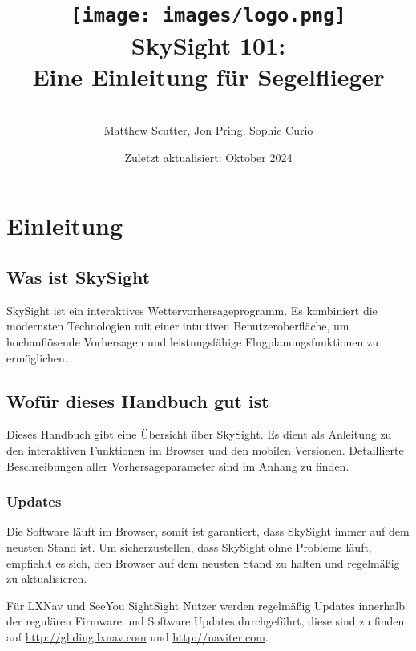 \documentclass[11pt,a4paper]{article}
\title{\texttt{[image: images/logo.png]}\\[1cm]SkySight 101: \\[0.5cm]Eine Einleitung für Segelflieger}
\author{\\Matthew Scutter, Jon Pring, Sophie Curio}
\date{Zuletzt aktualisiert: Oktober 2024}
\begin{document}
\begin{titlepage}
\maketitle
\end{titlepage}

\tableofcontents
\pagebreak

\section{Einleitung}
\subsection{Was ist SkySight}

SkySight ist ein interaktives Wettervorhersageprogramm. Es kombiniert die modernsten Technologien mit einer intuitiven Benutzeroberfläche, um hochauflösende Vorhersagen und leistungsfähige Flugplanungsfunktionen zu ermöglichen.




\subsection{Wofür dieses Handbuch gut ist}

Dieses Handbuch gibt eine Übersicht über SkySight. Es dient als Anleitung zu den interaktiven Funktionen im Browser und den mobilen Versionen. Detaillierte Beschreibungen aller Vorhersageparameter sind im Anhang zu finden.



\subsubsection{Updates}

Die Software läuft im Browser, somit ist garantiert, dass SkySight immer auf dem neusten Stand ist. Um sicherzustellen, dass SkySight ohne Probleme läuft, empfiehlt es sich, den Browser auf dem neusten Stand zu halten und regelmäßig zu aktualisieren.

Für LXNav und SeeYou SightSight Nutzer werden regelmäßig Updates innerhalb der regulären Firmware und Software Updates durchgeführt, diese sind zu finden auf \url{http://gliding.lxnav.com} und \url{http://naviter.com}.
\end{document}
